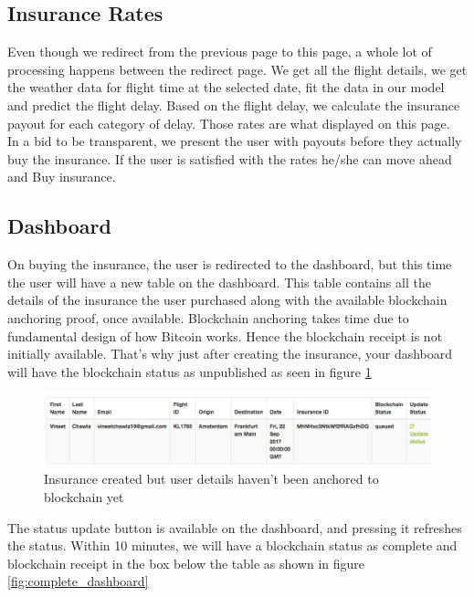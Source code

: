 \subsection{Insurance Rates}
Even though we redirect from the previous page to this page, a whole lot of processing happens between the redirect page. We get all the flight details, we get the weather data for flight time at the selected date, fit the data in our model and predict the flight delay. Based on the flight delay, we calculate the insurance payout for each category of delay. Those rates are what displayed on this page. 
\\In a bid to be transparent, we present the user with payouts before they actually buy the insurance. If the user is satisfied with the rates he/she can move ahead and Buy insurance.

\subsection{Dashboard}
On buying the insurance, the user is redirected to the dashboard, but this time the user will have a new table on the dashboard. This table contains all the details of the insurance the user purchased along with the available blockchain anchoring proof, once available. Blockchain anchoring takes time due to fundamental design of how Bitcoin works. Hence the blockchain receipt is not initially available. That's why just after creating the insurance, your dashboard will have the blockchain status as unpublished as seen in figure \ref{fig:mid_dashboard}

\begin{figure}[h]
    \centering
    \includegraphics[width=\textwidth]{Figures/mid_dashboard.png}
    \caption{Insurance created but user details haven't been anchored to blockchain yet}
    \label{fig:mid_dashboard}
\end{figure}

The status update button is available on the dashboard, and pressing it refreshes the status. Within 10 minutes, we will have a blockchain status as complete and blockchain receipt in the box below the table as shown in figure \ref{fig:complete_dashboard}

